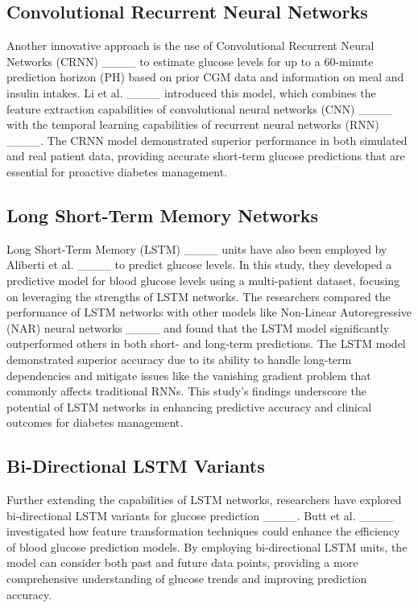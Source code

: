 \subsection{Convolutional Recurrent Neural Networks}
Another innovative approach is the use of Convolutional Recurrent Neural Networks (CRNN) ____ to estimate glucose levels for up to a 60-minute prediction horizon (PH) based on prior CGM data and information on meal and insulin intakes. Li et al. ____ introduced this model, which combines the feature extraction capabilities of convolutional neural networks (CNN) ____ with the temporal learning capabilities of recurrent neural networks (RNN) ____. The CRNN model demonstrated superior performance in both simulated and real patient data, providing accurate short-term glucose predictions that are essential for proactive diabetes management.

\subsection{Long Short-Term Memory Networks}
Long Short-Term Memory (LSTM) ____ units have also been employed by Aliberti et al. ____ to predict glucose levels. In this study, they developed a predictive model for blood glucose levels using a multi-patient dataset, focusing on leveraging the strengths of LSTM networks. The researchers compared the performance of LSTM networks with other models like Non-Linear Autoregressive (NAR) neural networks ____ and found that the LSTM model significantly outperformed others in both short- and long-term predictions. The LSTM model demonstrated superior accuracy due to its ability to handle long-term dependencies and mitigate issues like the vanishing gradient problem that commonly affects traditional RNNs. This study's findings underscore the potential of LSTM networks in enhancing predictive accuracy and clinical outcomes for diabetes management.

\subsection{Bi-Directional LSTM Variants}
Further extending the capabilities of LSTM networks, researchers have explored bi-directional LSTM variants for glucose prediction ____. Butt et al. ____ investigated how feature transformation techniques could enhance the efficiency of blood glucose prediction models. By employing bi-directional LSTM units, the model can consider both past and future data points, providing a more comprehensive understanding of glucose trends and improving prediction accuracy.

